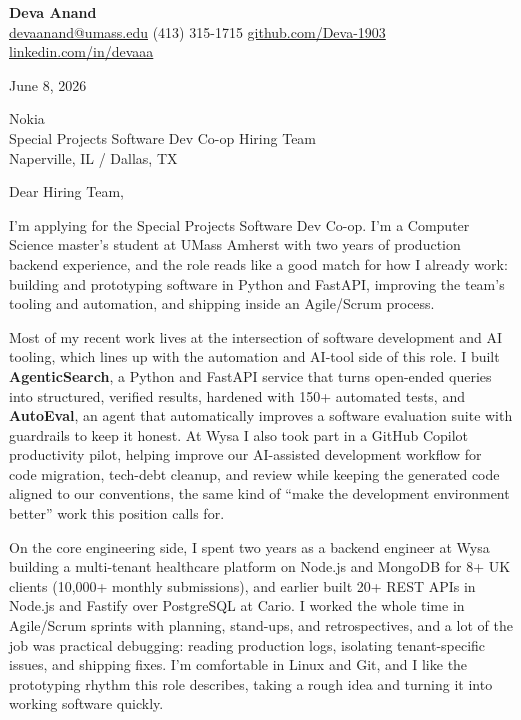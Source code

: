 \documentclass[letterpaper,11pt]{article}
\begin{document}
\begin{center}
  {\LARGE \bfseries \textcolor{ResumeNavy}{Deva Anand}} \\[3pt]
  {\small
  \href{mailto:devaanand@umass.edu}{devaanand@umass.edu} \enspace\textbar\enspace
  (413) 315-1715 \enspace\textbar\enspace
  \href{https://github.com/Deva-1903}{github.com/Deva-1903} \enspace\textbar\enspace
  \href{https://linkedin.com/in/devaaa/}{linkedin.com/in/devaaa}}
\end{center}
\vspace{6pt}

June 8, 2026

\vspace{2pt}
Nokia \\
Special Projects Software Dev Co-op Hiring Team \\
Naperville, IL / Dallas, TX

\vspace{6pt}
Dear Hiring Team,

I'm applying for the Special Projects Software Dev Co-op. I'm a Computer Science master's student at UMass Amherst with two years of production backend experience, and the role reads like a good match for how I already work: building and prototyping software in Python and FastAPI, improving the team's tooling and automation, and shipping inside an Agile/Scrum process.

Most of my recent work lives at the intersection of software development and AI tooling, which lines up with the automation and AI-tool side of this role. I built \textbf{AgenticSearch}, a Python and FastAPI service that turns open-ended queries into structured, verified results, hardened with 150+ automated tests, and \textbf{AutoEval}, an agent that automatically improves a software evaluation suite with guardrails to keep it honest. At Wysa I also took part in a GitHub Copilot productivity pilot, helping improve our AI-assisted development workflow for code migration, tech-debt cleanup, and review while keeping the generated code aligned to our conventions, the same kind of ``make the development environment better'' work this position calls for.

On the core engineering side, I spent two years as a backend engineer at Wysa building a multi-tenant healthcare platform on Node.js and MongoDB for 8+ UK clients (10,000+ monthly submissions), and earlier built 20+ REST APIs in Node.js and Fastify over PostgreSQL at Cario. I worked the whole time in Agile/Scrum sprints with planning, stand-ups, and retrospectives, and a lot of the job was practical debugging: reading production logs, isolating tenant-specific issues, and shipping fixes. I'm comfortable in Linux and Git, and I like the prototyping rhythm this role describes, taking a rough idea and turning it into working software quickly.
\end{document}
